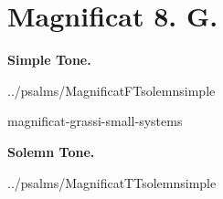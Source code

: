 {
\pagebreak
\thispagestyle{empty}
\newcommand{\printsimpletone}{
\needspace{3\baselineskip}
\begin{center}\textbf{Simple Tone.}\end{center}
\vspace{0ex plus 0ex minus 2ex}
}
\newcommand{\printsolemntone}{
\needspace{3\baselineskip}
\begin{center}\textbf{Solemn Tone.}\end{center}
\vspace{0ex plus 0ex minus 1ex}
}

\label{magnificat-grassi}
\vspace*{-\headheight}
\section{Magnificat 8. G.}

\def\betweenLilyPondSystem#1{
  \ifnum#1>1
    \vfil\noindent
  \else
    \linebreak
  \fi
}
\newcommand{\includelilypond}[1]{
  \noindent
  {#1}
}
\def\magsolemn{F}
\def\maggrassi{T}
\def\annot{\magtone. \magend}
\def\greinitialformat#1{%
{\fontsize{50}{50}\selectfont #1}%
}
\def\magoddverses{}
\global\def\magtex{../psalms/Magnificat\if\magsolemn Tsolemn\else simple\fi\magtone\nostarendmag}
\printsimpletone{}
\begin{oddversesmagnificat}{\magtex}
\magoddverses
\end{oddversesmagnificat}

\includelilypond{magnificat-grassi-small-systems}



\def\magsolemn{T}
\let\magant=\undefined
\let\magantlinetwo=\undefined
\let\magtex=\undefined
\let\magverses=\undefined
{}
\def\annot{\magtone. \magend}
\global\def\magtex{../psalms/Magnificat\if\magsolemn Tsolemn\else simple\fi\magtone\nostarendmag}
\printsolemntone{}
\begin{oddversesmagnificat}{\magtex}
\magoddverses
\end{oddversesmagnificat}
}